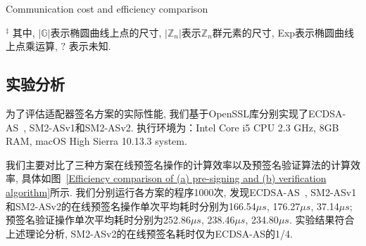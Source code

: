 \documentclass[review]{jcr}
\begin{document}
\begin{table*}[!h]
\begin{center}
\caption{通信成本与效率对比}{Communication cost and efficiency comparison}
\label{table1}
\end{center}
\scriptsize{$^\ddagger$ 其中, $|\mathbb{G}|$表示椭圆曲线上点的尺寸, $|\mathbb{Z}_n|$表示$\mathbb{Z}_n$群元素的尺寸, Exp表示椭圆曲线上点乘运算, $?$ 表示未知.}
\end{table*}


\subsection{实验分析}

为了评估适配器签名方案的实际性能, 我们基于OpenSSL库分别实现了ECDSA-AS~\cite{AumayrEEFHMMR20}, SM2-ASv1和SM2-ASv2. 执行环境为：Intel Core i5 CPU 2.3 GHz, 8GB RAM, macOS High Sierra 10.13.3 system. 

我们主要对比了三种方案在线预签名操作的计算效率以及预签名验证算法的计算效率, 具体如图~\ref{Efficiency comparison of (a) pre-signing and (b) verification algorithm}所示. 我们分别运行各方案的程序1000次, 发现ECDSA-AS~\cite{AumayrEEFHMMR20}, SM2-ASv1和SM2-ASv2的在线预签名操作单次平均耗时分别为166.54$\mu s$, 176.27$\mu s$, 37.14$\mu s$; 预签名验证操作单次平均耗时分别为252.86$\mu s$, 238.46$\mu s$, 234.80$\mu s$. 实验结果符合上述理论分析, SM2-ASv2的在线预签名耗时仅为ECDSA-AS的1/4.
\end{document}
